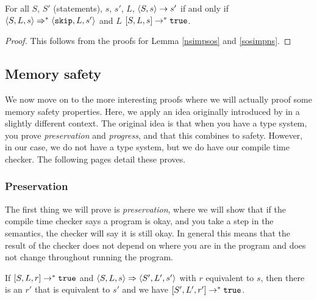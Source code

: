 \begin{theorem}
For all $S$, $S'$ (statements), $s$, $s'$, $L$, $\langle S, s \rangle \to s'$ if and only if $\langle S, L, s \rangle \Rightarrow ^{*} \langle \texttt{skip}, L, s' \rangle$ and $L$ $[ S, L, s ] \to^{*} \texttt{true}$.
\end{theorem}

\begin{proof}
This follows from the proofs for Lemma \ref{nsimpsos} and \ref{sosimpns}.
\end{proof}

\subsection{Memory safety}
We now move on to the more interesting proofs where we will actually proof some memory safety properties. Here, we apply an idea originally introduced by \cite{wright1994syntactic} in a slightly different context. The original idea is that when you have a type system, you prove \emph{preservation} and \emph{progress}, and that this combines to safety. However, in our case, we do not have a type system, but we do have our compile time checker. The following pages detail these proves.

\subsubsection*{Preservation}
The first thing we will prove is \emph{preservation}, where we will show that if the compile time checker says a program is okay, and you take a step in the semantics, the checker will say it is still okay. In general this means that the result of the checker does not depend on where you are in the program and does not change throughout running the program. 

\begin{theorem}
\label{preservation}
If $[ S, L, r ] \to ^* \texttt{true}$ and $\langle S, L, s \rangle \Rightarrow \langle S', L', s' \rangle$ with $r$ equivalent to $s$, then there is an $r'$ that is equivalent to $s'$ and we have $[ S', L', r' ] \to ^* \texttt{true}$.
\end{theorem}

